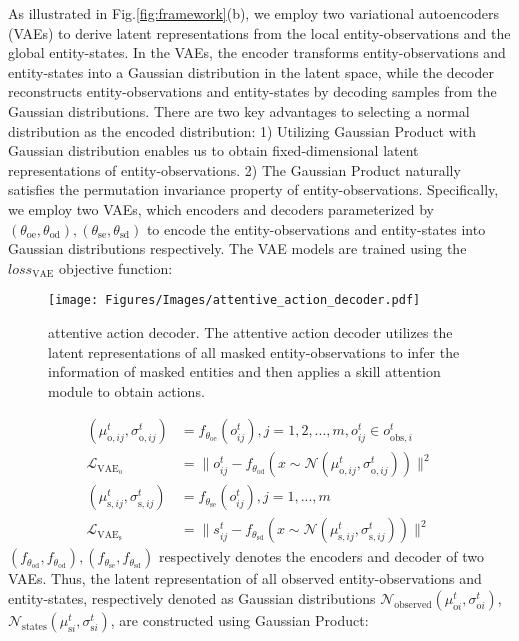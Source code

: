 As illustrated in Fig.\ref{fig:framework}(b), we employ two variational autoencoders (VAEs) to derive latent representations from the local entity-observations and the global entity-states. In the VAEs, the encoder transforms entity-observations and entity-states into a Gaussian distribution in the latent space, while the decoder reconstructs entity-observations and entity-states by decoding samples from the Gaussian distributions. There are two key advantages to selecting a normal distribution as the encoded distribution: 1) Utilizing Gaussian Product with Gaussian distribution enables us to obtain fixed-dimensional latent representations of entity-observations. 2) The Gaussian Product naturally satisfies the permutation invariance property of entity-observations. Specifically, we employ two VAEs, which encoders and decoders parameterized by $(\theta_{\mathrm{oe}} , \theta_{\mathrm{od}}),(\theta_{\mathrm{se}},\theta_{\mathrm{sd}})$ to encode the entity-observations and entity-states into Gaussian distributions respectively. The VAE models are trained using the $loss_{\mathrm{VAE}}$ objective function:
\begin{figure*}[t]
    \centering
    \texttt{[image: Figures/Images/attentive\_action\_decoder.pdf]}
    \caption{attentive action decoder. The attentive action decoder utilizes the latent representations of all masked entity-observations to infer the information of masked entities and then applies a skill attention module to obtain actions.
}
\label{fig:attention_decoder}
\end{figure*}
\begin{equation}
\begin{split}
(\mu_{\mathrm{o},ij}^t,\sigma_{\mathrm{o},ij}^t)&=f_{\theta_{\mathrm{oe}}}(o_{ij}^t),j=1,2,...,m, o_{ij}^t \in o_{\mathrm{obs},i}^t\\
\mathcal{L}_{\mathrm{VAE_o}}&=\|o_{ij}^t-f_{\theta_{\mathrm{od}}}(x \sim \mathcal{N}(\mu_{\mathrm{o},ij}^t, \sigma_{\mathrm{o},ij}^t))\|^2\\
(\mu_{\mathrm{s},ij}^t,\sigma_{\mathrm{s},ij}^t)&=f_{\theta_{\mathrm{se}}}(o_{ij}^t),j=1,...,m\\
\mathcal{L}_{\mathrm{VAE_s}}&=\|s_{ij}^t-f_{\theta_{\mathrm{sd}}}(x \sim \mathcal{N}(\mu_{\mathrm{s},ij}^t, \sigma_{\mathrm{s},ij}^t))\|^2
\label{eq:(2)}
\end{split}
\end{equation}
$(f_{\theta_{\mathrm{od}}},f_{\theta_{\mathrm{od}}}),(f_{\theta_{\mathrm{se}}},f_{\theta_{\mathrm{sd}}})$ respectively denotes the encoders and decoder of two VAEs. Thus, the latent representation of all observed entity-observations and entity-states, respectively denoted as Gaussian distributions $\mathcal{N}_{\mathrm{observed}}(\mu_{\mathrm{o}i}^t, \sigma_{\mathrm{o}i}^t)$, $\mathcal{N}_{\mathrm{states}}(\mu_{\mathrm{s}i}^t,\sigma_{\mathrm{s}i}^t)$, are constructed using Gaussian Product:

